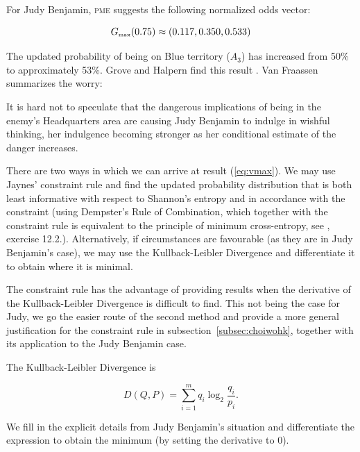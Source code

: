 \documentclass[phd,12pt,oneside]{ubcthesis}
\begin{document}
For Judy Benjamin, \textsc{pme} suggests the following normalized
odds vector:

\begin{equation}
  \label{eq:vmax}
  G_{\mbox{{\tiny max}}}(0.75)\approx(0.117,0.350,0.533)
\end{equation}

{\noindent}The updated probability of being on Blue territory ($A_{3}$) has
increased from 50\% to approximately 53\%. Grove and Halpern find this
result  .
Van Fraassen summarizes the worry:
\begin{quotex}
  It is hard not to speculate that the dangerous implications of being
  in the enemy's Headquarters area are causing Judy Benjamin to
  indulge in wishful thinking, her indulgence becoming stronger as her
  conditional estimate of the danger increases. 
\end{quotex}

\bigskip

\nial There are two ways in which we can arrive at result
({\ref{eq:vmax}}). We may use Jaynes' constraint rule and find the
updated probability distribution that is both least informative with
respect to Shannon's entropy and in accordance with the constraint
(using Dempster's Rule of Combination, which together with the
constraint rule is equivalent to the principle of minimum
cross-entropy, see , exercise 12.2.).
Alternatively, if circumstances are favourable (as they are in Judy
Benjamin's case), we may use the Kullback-Leibler Divergence and
differentiate it to obtain where it is minimal.


The constraint rule has the advantage of providing results when the
derivative of the Kullback-Leibler Divergence is difficult to find.
This not being the case for Judy, we go the easier route of the second
method and provide a more general justification for the constraint
rule in subsection~\ref{subsec:choiwohk}, together with its
application to the Judy Benjamin case.

The Kullback-Leibler Divergence is

\begin{equation}
  \label{eq:gujeshoh}
  D(Q,P)=\sum_{i=1}^{m}q_{i}\log_{2}\frac{q_{i}}{p_{i}}.
\end{equation}

{\noindent}We fill in the explicit details from Judy Benjamin's situation and
differentiate the expression to obtain the minimum (by setting the
derivative to $0$). 
\end{document}
